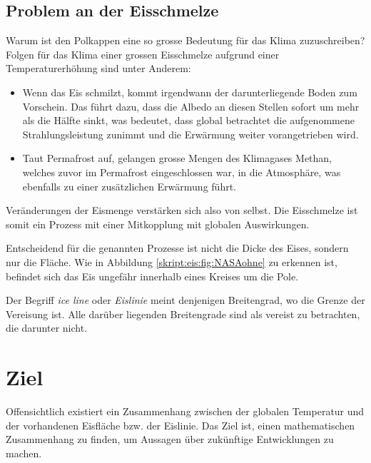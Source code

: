 \begin{refsection}
\subsection{Problem an der Eisschmelze} \label{skript:eis:Problem an der Eisschmelze}
Warum ist den Polkappen eine so grosse Bedeutung für das Klima zuzuschreiben? Folgen für das Klima einer grossen Eisschmelze aufgrund einer Temperaturerhöhung sind unter Anderem: 
\begin{itemize}
	\item Wenn das Eis schmilzt, kommt irgendwann der darunterliegende Boden zum Vorschein. Das führt dazu, dass die Albedo an diesen Stellen sofort um mehr als die Hälfte sinkt, was bedeutet, dass global betrachtet die aufgenommene Strahlungsleistung zunimmt und die Erwärmung weiter vorangetrieben wird.
	\item Taut Permafrost auf, gelangen grosse Mengen des Klimagases Methan, welches zuvor im Permafrost eingeschlossen war, in die Atmosphäre, was ebenfalls zu einer zusätzlichen Erwärmung führt.
%
%
\end{itemize}
Veränderungen der Eismenge verstärken sich also von selbst.
Die Eisschmelze ist somit ein Prozess mit einer Mitkopplung mit globalen Auswirkungen.

Entscheidend für die genannten Prozesse ist nicht die Dicke des Eises, sondern nur die Fläche. Wie in Abbildung \ref{skript:eis:fig:NASAohne} zu erkennen ist, befindet sich das Eis ungefähr innerhalb eines Kreises um die Pole.
\begin{definition}
	Der Begriff {\em ice line} oder {\em Eislinie} meint denjenigen Breitengrad, wo die Grenze der Vereisung ist.
	Alle darüber liegenden Breitengrade sind als vereist zu betrachten, die darunter nicht.
	\label{skript:def:iceline}
\end{definition}
\section{Ziel}
Offensichtlich existiert ein Zusammenhang zwischen der globalen Temperatur und der vorhandenen Eisfläche bzw. der Eislinie. Das Ziel ist, einen mathematischen Zusammenhang zu finden, um Aussagen über zukünftige Entwicklungen zu machen.

\end{refsection}
